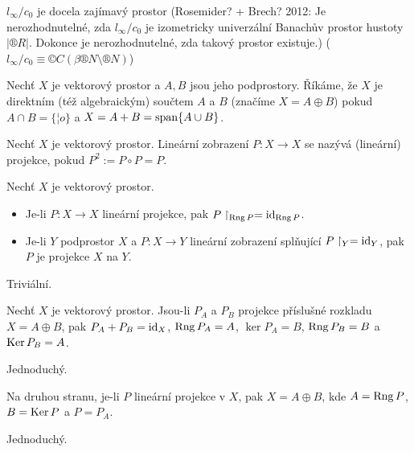 \documentclass[12pt]{article}					%
\begin{document}
\begin{poznamka}[Zajímavosti]
	$l_∞ / c_0$ je docela zajímavý prostor (Rosemider? + Brech? 2012: Je nerozhodnutelné, zda $l_∞ / c_0$ je izometricky univerzální Banachův prostor hustoty $|®R|$. Dokonce je nerozhodnutelné, zda takový prostor existuje.) ($l_∞ / c_0 ≡ ©C(\beta ®N \setminus ®N)$)
\end{poznamka}

\begin{definice}
	Nechť $X$ je vektorový prostor a $A, B$ jsou jeho podprostory. Říkáme, že $X$ je direktním (též algebraickým) součtem $A$ a $B$ (značíme $X = A \oplus B$) pokud $A \cap B = \{¦o\}$ a $X = A + B = \operatorname{span}\{A \cup B\}$.
\end{definice}

\begin{definice}[Projekce]
	Nechť $X$ je vektorový prostor. Lineární zobrazení $P: X \rightarrow X$ se nazývá (lineární) projekce, pokud $P^2 := P \circ P = P$.
\end{definice}

\begin{tvrzeni}[Fakt]
	Nechť $X$ je vektorový prostor.

	\begin{itemize}
		\item Je-li $P: X \rightarrow X$ lineární projekce, pak $P\upharpoonright_{\operatorname{Rng} P} = \operatorname{id}_{\operatorname{Rng} P}$.
		\item Je-li $Y$ podprostor $X$ a $P: X \rightarrow Y$ lineární zobrazení splňující $P\upharpoonright_Y = \operatorname{id}_Y$, pak $P$ je projekce $X$ na $Y$.
	\end{itemize}

	\begin{dukazin}
		Triviální.
	\end{dukazin}
\end{tvrzeni}

\begin{tvrzeni}
	Nechť $X$ je vektorový prostor. Jsou-li $P_A$ a $P_B$ projekce příslušné rozkladu $X = A \oplus B$, pak $P_A + P_B = \operatorname{id}_X$, $\operatorname{Rng} P_A = A$, $\ker P_A = B$, $\operatorname{Rng} P_B = B$ a $\operatorname{Ker} P_B = A$.

	\begin{dukazin}
		Jednoduchý.
	\end{dukazin}

	Na druhou stranu, je-li $P$ lineární projekce v $X$, pak $X = A \oplus B$, kde $A = \operatorname{Rng} P$, $B = \operatorname{Ker} P$ a $P = P_A$.

	\begin{dukazin}
		Jednoduchý.
	\end{dukazin}
\end{tvrzeni}
\end{document}
